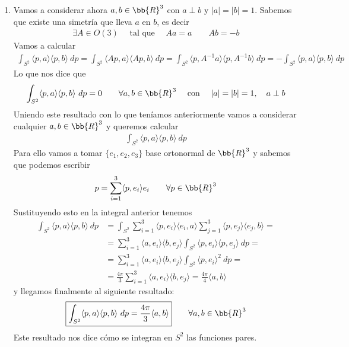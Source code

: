 \begin{ejemplo}
\begin{enumerate}
        \item Vamos a considerar ahora $a,b\in \bb{R}^3$ con $a\perp b$ y $|a|=|b|=1$. Sabemos que existe una simetría que lleva $a$ en $b$, es decir
        \begin{gather*}
            \exists A \in O(3) \quad \text{ tal que } \quad Aa=a \qquad Ab=-b
        \end{gather*}
        Vamos a calcular
        \begin{gather*}
            \int_{S^2} \langle p,a \rangle \langle p,b\rangle\ dp = 
            \int_{S^2} \langle Ap, a \rangle \langle Ap, b \rangle\ dp =
            \int_{S^2} \langle p, A^{-1}a \rangle \langle p,A^{-1}b \rangle\ dp = 
            -\int_{S^2} \langle p, a \rangle \langle p, b \rangle\ dp
        \end{gather*}
        Lo que nos dice que 
        \begin{gather*}
            \int_{S^2} \langle p,a \rangle \langle p,b\rangle\ dp = 0 \qquad \forall a,b\in \bb{R}^3 \quad \text{ con } \quad |a|=|b|=1,\quad a\perp b
        \end{gather*}
        Uniendo este resultado con lo que teníamos anteriormente vamos a considerar cualquier $a,b\in \bb{R}^3$ y queremos calcular
        \begin{gather*}
            \int_{S^2} \langle p,a \rangle \langle p,b \rangle \ dp
        \end{gather*}
        Para ello vamos a tomar $\{e_1, e_2, e_3\}$ base ortonormal de $\bb{R}^3$ y sabemos que podemos escribir
        \begin{gather*}
            p = \sum_{i=1}^3\langle p, e_i\rangle e_i \qquad \forall p \in \bb{R}^3
        \end{gather*}
        Sustituyendo esto en la integral anterior tenemos
        \begin{align*}
            \int_{S^2} \langle p,a \rangle \langle p,b \rangle \ dp &=
            \int_{S^2} \sum_{i=1}^3\langle p, e_i\rangle \langle e_i, a \rangle \sum_{j=1}^3\langle p, e_j\rangle \langle e_j, b \rangle = \\
            &=
            \sum_{i=1}^3 \langle a, e_i \rangle \langle b, e_j \rangle \int_{S^2} \langle p, e_i \rangle \langle p, e_j \rangle\ dp = \\
            &=
            \sum_{i=1}^3 \langle a, e_i \rangle \langle b, e_j \rangle \int_{S^2} \langle p, e_i \rangle^2\ dp = \\
            &=
            \frac{4\pi}{3} \sum_{i=1}^3 \langle a, e_i \rangle \langle b, e_j \rangle = \frac{4\pi}{4} \langle a,b \rangle
        \end{align*}
        y llegamos finalmente al siguiente resultado:
        \begin{gather*}
            \boxed{\int_{S^2} \langle p,a \rangle \langle p,b \rangle\ dp = \frac{4\pi}{3} \langle a, b \rangle} \qquad \forall a,b\in \bb{R}^3
        \end{gather*}
        Este resultado nos dice cómo se integran en $S^2$ las funciones pares.


\end{enumerate}
\end{ejemplo}
